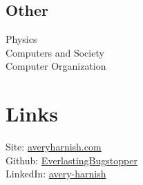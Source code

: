 \documentclass[letterpaper]{deedy-resume} %
\begin{document}
\begin{minipage}[t]{0.35\textwidth}
\sectionspace

\subsection{Other}
Physics\\
Computers and Society\\
Computer Organization


\sectionspace %



\section{Links} 

Site: \href{https://averyharnish.com}{averyharnish.com} \\
Github: \href{https://github.com/EverlastingBugstopper}{EverlastingBugstopper} \\
LinkedIn: \href{https://linkedin.com/in/avery-harnish}{avery-harnish} \\


\sectionspace %


\end{minipage} %
\hfill
%
%
\end{document}
